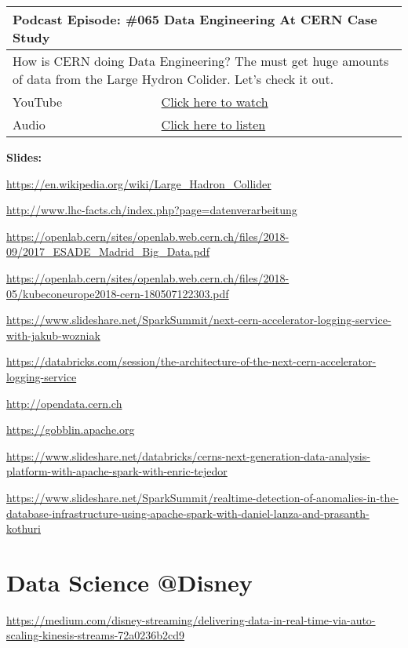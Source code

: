 \documentclass[12pt, numbers=noenddot]{scrreprt} %
\begin{document}
\begin{table}[h]
\begin{tabular}{ll}
\hline
\multicolumn{2}{l}{\textbf{Podcast Episode:} \#065 Data Engineering At CERN Case Study} \\ \hline
\multicolumn{2}{p{15cm}}{How is CERN doing Data Engineering? The must get huge amounts of data from the Large Hydron Colider. Let's check it out.}         \\ \hline
\multicolumn{1}{l|}{YouTube}   & \href{https://youtu.be/LrhfzPsKaDE}{Click here to watch}   \\ 
\multicolumn{1}{l|}{Audio}     & \href{https://anchor.fm/andreaskayy/episodes/065-Data-Engineering-At-CERN-Case-Study-e45ime}{Click here to listen}   \\ \hline
\end{tabular}
\end{table}

\textbf{Slides:}

\url{https://en.wikipedia.org/wiki/Large_Hadron_Collider}

\url{http://www.lhc-facts.ch/index.php?page=datenverarbeitung}

\url{https://openlab.cern/sites/openlab.web.cern.ch/files/2018-09/2017_ESADE_Madrid_Big_Data.pdf}

\url{https://openlab.cern/sites/openlab.web.cern.ch/files/2018-05/kubeconeurope2018-cern-180507122303.pdf}

\url{https://www.slideshare.net/SparkSummit/next-cern-accelerator-logging-service-with-jakub-wozniak}

\url{https://databricks.com/session/the-architecture-of-the-next-cern-accelerator-logging-service}

\url{http://opendata.cern.ch}

\url{https://gobblin.apache.org}

\url{https://www.slideshare.net/databricks/cerns-next-generation-data-analysis-platform-with-apache-spark-with-enric-tejedor}

\url{https://www.slideshare.net/SparkSummit/realtime-detection-of-anomalies-in-the-database-infrastructure-using-apache-spark-with-daniel-lanza-and-prasanth-kothuri}


\section{Data Science @Disney}
\url{https://medium.com/disney-streaming/delivering-data-in-real-time-via-auto-scaling-kinesis-streams-72a0236b2cd9}
\end{document}

